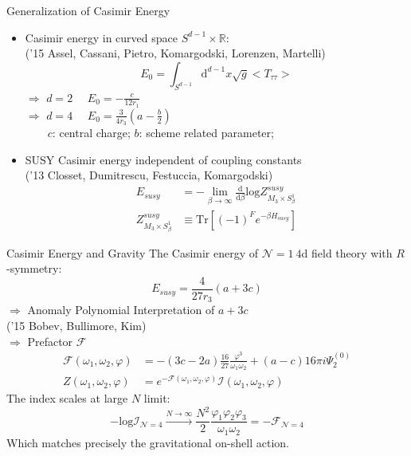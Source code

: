 \documentclass{beamer}
\begin{document}
\begin{frame}{Generalization of Casimir Energy}
    \begin{itemize}
        \item Casimir energy in curved space $S^{d-1}\times\mathbb{R}$:\\
        {\color{blue} ('15 Assel, Cassani, Pietro, Komargodski, Lorenzen, Martelli)}\\
        \begin{equation*}
            E_0=\int_{S^{d-1}}\mathrm{d}^{d-1}x\sqrt{g}\big<T_{\tau\tau}\big>
        \end{equation*}
        $\Rightarrow$ $d=2$ $\quad E_0=-\frac{c}{12r_1}$  \\  
        $\Rightarrow$ $d=4$ $\quad E_0=\frac{3}{4r_3}(a-\frac{b}{2})$ \\
        $\qquad c$: central charge; $b$: scheme related parameter; 
        \item SUSY Casimir energy independent of coupling constants\\
        {\color{blue}('13 Closset, Dumitrescu, Festuccia, Komargodski)}
        \begin{equation*}
        \begin{split}
            E_{susy}&=-\lim_{\beta\to\infty}\frac{\mathrm{d}}{\mathrm{d}\beta}\mathrm{log}Z^{susy}_{M_3\times S_\beta^1}\\
            Z^{susy}_{M_3\times S_\beta^1}&\equiv\mathrm{Tr}[(-1)^Fe^{-\beta H_{susy}}]
        \end{split}
        \end{equation*}
    \end{itemize}
\end{frame}
\begin{frame}{Casimir Energy and Gravity}
    The Casimir energy of $\mathcal{N}=1\ 4$d field theory with $R$-symmetry:
    \begin{equation*}
        E_{susy}=\frac{4}{27r_3}(a+3c)
    \end{equation*}
    $\Rightarrow$ Anomaly Polynomial Interpretation of $a+3c$\\
    {\color{blue}('15 Bobev, Bullimore, Kim)}\\
    $\Rightarrow$ Prefactor $\mathcal{F}$
    \begin{equation*}
    \begin{split}
        \mathcal{F}(\omega_1,\omega_2,\varphi)&=-(3c-2a)\frac{16}{27}\frac{\varphi^3}{\omega_1\omega_2}+(a-c)16\pi i\Psi_2^{(0)}\\
        Z(\omega_1,\omega_2,\varphi)&=e^{-\mathcal{F}(\omega_1,\omega_2,\varphi)}\mathcal{I}(\omega_1,\omega_2,\varphi)
    \end{split}
    \end{equation*}
    The index scales at large $N$ limit:
    \begin{equation*}
        -\mathrm{log}\mathcal{I}_{\mathcal{N}=4}\stackrel{N\to\infty}{\longrightarrow}\frac{N^2}{2}\frac{\varphi_1\varphi_2\varphi_3}{\omega_1\omega_2}=-\mathcal{F}_{\mathcal{N}=4}
    \end{equation*}
    Which matches precisely the gravitational on-shell action.
\end{frame}
\end{document}
